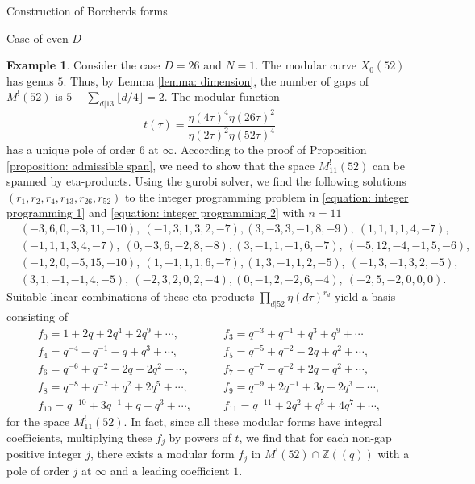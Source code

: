 \documentclass{amsart}
\newcounter{lemma}
\theoremstyle{definition}
\newtheorem{Example}[lemma]{Example}
\def\Z{\mathbb Z}
\begin{document}
\begin{section}{Construction of Borcherds forms}
\begin{subsection}{Case of even $D$}
\begin{Example} \label{example: 26-1}
Consider the case $D=26$ and $N=1$. The modular curve $X_0(52)$ has
genus $5$. Thus, by Lemma \ref{lemma: dimension}, the number of gaps
of $M^!(52)$ is $5-\sum_{d|13}\lfloor d/4\rfloor=2$. The modular function
$$
  t(\tau)=\frac{\eta(4\tau)^4\eta(26\tau)^2}{\eta(2\tau)^2\eta(52\tau)^4}
$$
has a unique pole of order $6$ at $\infty$. According to the proof of
Proposition \ref{proposition: admissible span}, we need to show that
the space $M^!_{11}(52)$ can be spanned by eta-products. Using the gurobi
solver, we find the following solutions
$(r_1,r_2,r_4,r_{13},r_{26},r_{52})$ to the integer
programming problem in \eqref{equation: integer programming 1} and
\eqref{equation: integer programming 2} with $n=11$
\begin{equation*}
\begin{split}
 &(-3 , 6 , 0 , -3 , 11 , -10), \ (-1 , 3 , 1 , 3 , 2 , -7),
  (3 , -3 , 3 , -1 , 8 , -9), \ (1 , 1 , 1 , 1 , 4 , -7), \\
 &(-1 , 1 , 1 , 3 , 4 , -7), \ (0 , -3 , 6 , -2 , 8 , -8),
  (3 , -1 , 1 , -1 , 6 , -7), \ (-5 , 12 , -4 , -1 , 5 , -6), \\
 &(-1 , 2 , 0 , -5 , 15 , -10), \ (1 , -1 , 1 , 1 , 6 , -7),
  (1 , 3 , -1 , 1 , 2 , -5), \ (-1 , 3 , -1 , 3 , 2 , -5), \\
 &(3 , 1 , -1 , -1 , 4 , -5), \ (-2 , 3 , 2 , 0 , 2 , -4),
  (0 , -1 , 2 , -2 , 6 , -4), \ (-2 , 5 , -2 , 0 , 0 , 0).
\end{split}
\end{equation*}
Suitable linear combinations of these eta-products
$\prod_{d|52}\eta(d\tau)^{r_d}$ yield a basis consisting of
\begin{equation*}
\begin{split}
  f_0=1+2q+2q^4+2q^9+\cdots, \qquad
  &f_3=q^{-3}+q^{-1}+q^3+q^9+\cdots \\
  f_4=q^{-4}-q^{-1}-q+q^3+\cdots, \qquad
  &f_5=q^{-5}+q^{-2}-2q+q^2+\cdots, \\
  f_6=q^{-6}+q^{-2}-2q+2q^2+\cdots, \qquad
  &f_7=q^{-7}-q^{-2}+2q-q^2+\cdots, \\
  f_8=q^{-8}+q^{-2}+q^2+2q^5+\cdots, \qquad
  &f_9=q^{-9}+2q^{-1}+3q+2q^3+\cdots, \\
  f_{10}=q^{-10}+3q^{-1}+q-q^3+\cdots, \qquad
  &f_{11}=q^{-11}+2q^2+q^5+4q^7+\cdots,
\end{split}
\end{equation*}
for the space $M^!_{11}(52)$. In fact, since all these modular forms
have integral coefficients, multiplying these $f_j$ by powers of
$t$, we find that for each non-gap positive integer $j$, there exists
a modular form $f_j$ in $M^!(52)\cap\Z((q))$ with a pole of order $j$
at $\infty$ and a leading coefficient $1$.
\end{Example}


\end{subsection}
\end{section}
\end{document}
